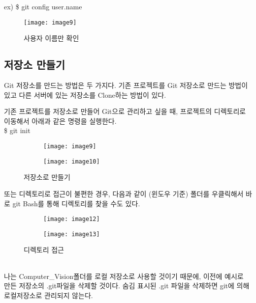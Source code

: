 \documentclass[titlepage]{article}
\begin{document}
ex) \$ git config user.name\\

\begin{figure}[h]
		\texttt{[image: image9]}
		\caption{사용자 이름만 확인}
		\label{fig:figure5}
		\end{figure}
		\subsection{ 저장소 만들기}
		Git 저장소를 만드는 방법은 두 가지다. 기존 프로젝트를 Git 저장소로 만드는 방법이 있고 다른 서버에 있는 저장소를 Clone하는 방법이 있다. 

\par
\noindent 기존 프로젝트를 저장소로 만들어 Git으로 관리하고 싶을 때, 프로젝트의 디렉토리로 이동해서 아래과 같은 명령을 실행한다.\\

\$ git init\\
\begin{figure}[h]
 
		\begin{subfigure}{0.5\textwidth}
		\texttt{[image: image9]} 
		\end{subfigure}
		\begin{subfigure}{0.5\textwidth}
		\texttt{[image: image10]}
		
	
		\end{subfigure}
 
		\caption{저장소로 만들기}
		\label{fig:figure6}
		\end{figure}
		\par
\noindent 또는 디렉토리로 접근이 불편한 경우, 다음과 같이 (윈도우 기준) 폴더를 우클릭해서 바로 git Bash를 통해 디렉토리를 찾을 수도 있다.\\
		\begin{figure}[h]
 
		\begin{subfigure}{0.5\textwidth}
		\texttt{[image: image12]} 
		\end{subfigure}
		\begin{subfigure}{0.5\textwidth}
		\texttt{[image: image13]}
		
	
		\end{subfigure}
 
		\caption{디렉토리 접근}
		\label{fig:figure7}
		\end{figure}
		\\
나는 Computer\_Vision폴더를 로컬 저장소로 사용할 것이기 때문에,
이전에 예시로 만든 저장소의 .git파일을 삭제할 것이다. 숨김 표시된 .git 파일을 삭제하면 git에 의해 로컬저장소로 관리되지 않는다.
\\
\end{document}
